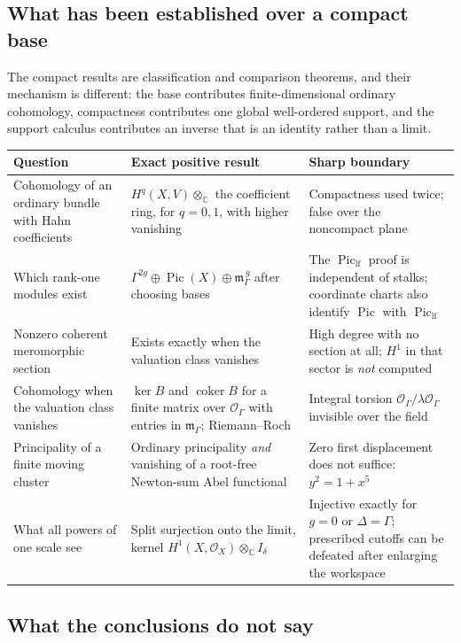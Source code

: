 \documentclass[11pt,letterpaper]{article}
\theoremstyle{definition}
\theoremstyle{remark}
\newcommand{\C}{\mathbb C}
\newcommand{\OO}{\mathcal O}
\newcommand{\mK}{\mathfrak m_\Gamma}
\newcommand{\Pic}{\operatorname{Pic}}
\newcommand{\Piclf}{\operatorname{Pic}_{\mathrm{lf}}}
\newcommand{\coker}{\operatorname{coker}}
\numberwithin{equation}{section}
\begin{document}
\subsection{What has been established over a compact base}

The compact results are classification and comparison theorems, and their mechanism is different: the base contributes finite-dimensional ordinary cohomology, compactness contributes one global well-ordered support, and the support calculus contributes an inverse that is an identity rather than a limit.

\begin{center}\small
\begin{tabular}{@{}L{0.26\textwidth}L{0.32\textwidth}L{0.32\textwidth}@{}}
\toprule
Question & Exact positive result & Sharp boundary\\
\midrule
Cohomology of an ordinary bundle with Hahn coefficients & $H^q(X,V)\otimes_\C$ the coefficient ring, for $q=0,1$, with higher vanishing & Compactness used twice; false over the noncompact plane\\[0.45em]
Which rank-one modules exist & $\Gamma^{2g}\oplus\Pic(X)\oplus\mK^{\,g}$ after choosing bases & The $\Piclf$ proof is independent of stalks; coordinate charts also identify $\Pic$ with $\Piclf$\\[0.45em]
Nonzero coherent meromorphic section & Exists exactly when the valuation class vanishes & High degree with no section at all; $H^1$ in that sector is \emph{not} computed\\[0.45em]
Cohomology when the valuation class vanishes & $\ker B$ and $\coker B$ for a finite matrix over $\OO_\Gamma$ with entries in $\mK$; Riemann--Roch & Integral torsion $\OO_\Gamma/\lambda\OO_\Gamma$ invisible over the field\\[0.45em]
Principality of a finite moving cluster & Ordinary principality \emph{and} vanishing of a root-free Newton-sum Abel functional & Zero first displacement does not suffice: $y^2=1+x^5$\\[0.45em]
What all powers of one scale see & Split surjection onto the limit, kernel $H^1(X,\OO_X)\otimes_\C I_\delta$ & Injective exactly for $g=0$ or $\Delta=\Gamma$; prescribed cutoffs can be defeated after enlarging the workspace\\
\bottomrule
\end{tabular}
\end{center}

\subsection{What the conclusions do not say}
\end{document}
